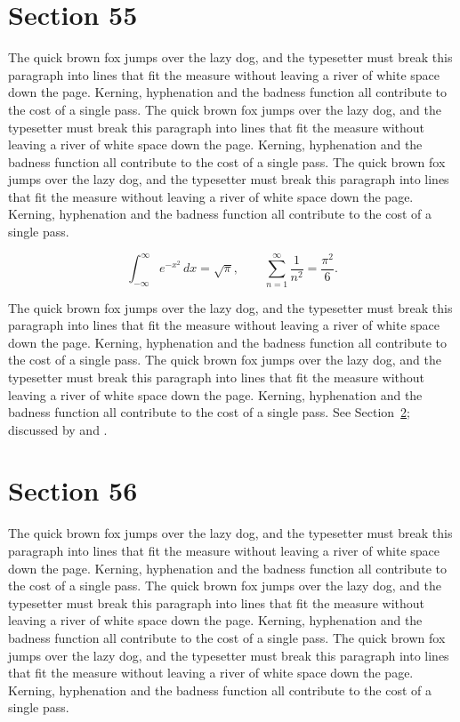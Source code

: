 \documentclass{article}
\begin{document}
\section{Section 55}
\label{sec:55}
The quick brown fox jumps over the lazy dog, and the typesetter must break this paragraph into lines that fit the measure without leaving a river of white space down the page. Kerning, hyphenation and the badness function all contribute to the cost of a single pass. The quick brown fox jumps over the lazy dog, and the typesetter must break this paragraph into lines that fit the measure without leaving a river of white space down the page. Kerning, hyphenation and the badness function all contribute to the cost of a single pass. The quick brown fox jumps over the lazy dog, and the typesetter must break this paragraph into lines that fit the measure without leaving a river of white space down the page. Kerning, hyphenation and the badness function all contribute to the cost of a single pass. 

\begin{equation}\label{eq:55}
\int_{-\infty}^{\infty} e^{-x^{2}}\,dx = \sqrt{\pi}, \qquad
\sum_{n=1}^{\infty} \frac{1}{n^{2}} = \frac{\pi^{2}}{6}.
\end{equation}

The quick brown fox jumps over the lazy dog, and the typesetter must break this paragraph into lines that fit the measure without leaving a river of white space down the page. Kerning, hyphenation and the badness function all contribute to the cost of a single pass. The quick brown fox jumps over the lazy dog, and the typesetter must break this paragraph into lines that fit the measure without leaving a river of white space down the page. Kerning, hyphenation and the badness function all contribute to the cost of a single pass. 
See Section~\ref{sec:56}; discussed by \textcite{k1} and \textcite{l3}.
\section{Section 56}
\label{sec:56}
The quick brown fox jumps over the lazy dog, and the typesetter must break this paragraph into lines that fit the measure without leaving a river of white space down the page. Kerning, hyphenation and the badness function all contribute to the cost of a single pass. The quick brown fox jumps over the lazy dog, and the typesetter must break this paragraph into lines that fit the measure without leaving a river of white space down the page. Kerning, hyphenation and the badness function all contribute to the cost of a single pass. The quick brown fox jumps over the lazy dog, and the typesetter must break this paragraph into lines that fit the measure without leaving a river of white space down the page. Kerning, hyphenation and the badness function all contribute to the cost of a single pass. 
\end{document}
